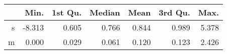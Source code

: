 \begin{table}[ht]
\centering
\begin{tabular}{rrrrrrr}
  \hline
 & Min. & 1st Qu. & Median & Mean & 3rd Qu. & Max. \\ 
  \hline
s & -8.313 & 0.605 & 0.766 & 0.844 & 0.989 & 5.378 \\ 
  m & 0.000 & 0.029 & 0.061 & 0.120 & 0.123 & 2.426 \\ 
   \hline
\end{tabular}
\end{table}
